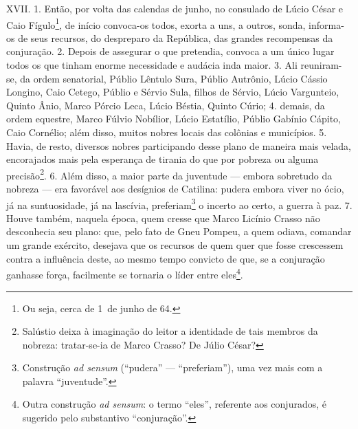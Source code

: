XVII. 1. Então, por volta das calendas de junho, no consulado de Lúcio César e
Caio Fígulo\footnote{Ou seja, cerca de 1\oi\ de junho de 64.}, de início
convoca-os todos, exorta a uns, a outros, sonda, informa-os de seus recursos,
do despreparo da República, das grandes recompensas da conjuração. 2. Depois de
assegurar o que pretendia, convoca a um único lugar todos os que tinham enorme
necessidade e audácia inda maior. 3. Ali reuniram-se, da ordem senatorial,
Públio Lêntulo Sura, Públio Autrônio, Lúcio Cássio Longino, Caio Cetego, Públio
e Sérvio Sula, filhos de Sérvio, Lúcio Vargunteio, Quinto Ânio, Marco Pórcio
Leca, Lúcio Béstia, Quinto Cúrio; 4. demais, da ordem equestre, Marco Fúlvio
Nobílior, Lúcio Estatílio, Públio Gabínio Cápito, Caio Cornélio; além disso,
muitos nobres locais das colônias e municípios. 5. Havia, de resto, diversos
nobres participando desse plano de maneira mais velada, encorajados mais pela
esperança de tirania do que por pobreza ou alguma precisão\footnote{Salústio
deixa à imaginação do leitor a identidade de tais membros da nobreza:
tratar-se-ia de Marco Crasso? De Júlio César?}. 6. Além disso, a maior parte da
juventude --- embora sobretudo da nobreza --- era favorável aos desígnios de
Catilina: pudera embora viver no ócio, já na suntuosidade, já na lascívia,
preferiam\footnote{Construção \emph{ad sensum} (``pudera'' --- ``preferiam''),
uma vez mais com a palavra ``juventude''.} o incerto ao certo, a guerra à paz.
7. Houve também, naquela época, quem cresse que Marco Licínio Crasso não
desconhecia seu plano: que, pelo fato de Gneu Pompeu, a quem odiava, comandar
um grande exército, desejava que os recursos de quem quer que fosse crescessem
contra a influência deste, ao mesmo tempo convicto de que, se a conjuração
ganhasse força, facilmente se tornaria o líder entre eles\footnote{Outra
construção \emph{ad sensum}: o termo ``eles'', referente aos conjurados, é
sugerido pelo substantivo ``conjuração''.}.

